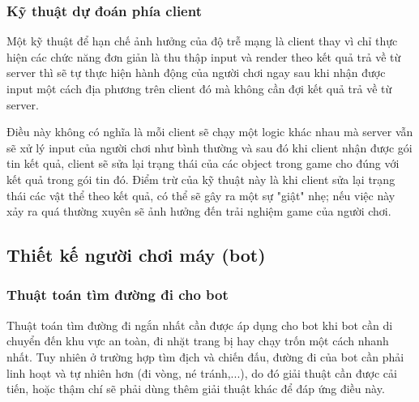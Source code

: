 \documentclass[12pt,a4paper]{article}
\begin{document}
  \subsubsection{Kỹ thuật dự đoán phía client}
  Một kỹ thuật để hạn chế ảnh hưởng của độ trễ mạng là client thay vì chỉ thực hiện các chức năng đơn giản là thu thập input và render theo kết quả trả về từ server thì sẽ tự thực hiện hành động của người chơi ngay sau khi nhận được input một cách địa phương trên client đó mà không cần đợi kết quả trả về từ server.
  
  Điều này không có nghĩa là mỗi client sẽ chạy một logic khác nhau mà server vẫn sẽ xử lý input của người chơi như bình thường và sau đó khi client nhận được gói tin kết quả, client sẽ sửa lại trạng thái của các object trong game cho đúng với kết quả trong gói tin đó. Điểm trừ của kỹ thuật này là khi client sửa lại trạng thái các vật thể theo kết quả, có thể sẽ gây ra một sự "giật" nhẹ; nếu việc này xảy ra quá thường xuyên sẽ ảnh hưởng đến trải nghiệm game của người chơi.
  
  \subsection{Thiết kế người chơi máy (bot)}
  \subsubsection{Thuật toán tìm đường đi cho bot}
  Thuật toán tìm đường đi ngắn nhất cần được áp dụng cho bot khi bot cần di chuyển đến khu vực an toàn, đi nhặt trang bị hay chạy trốn một cách nhanh nhất. Tuy nhiên ở trường hợp tìm địch và chiến đấu, đường đi của bot cần phải linh hoạt và tự nhiên hơn (đi vòng, né tránh,...), do đó giải thuật cần được cải tiến, hoặc thậm chí sẽ phải dùng thêm giải thuật khác để đáp ứng điều này.
\end{document}
